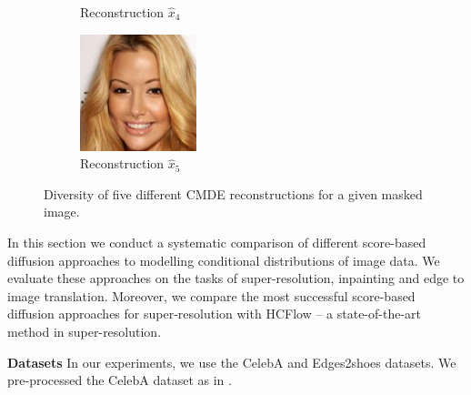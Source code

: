 \begin{figure}
\begin{subfigure}{.135\textwidth}
        \caption{\scriptsize Reconstruction $\hat{x}_4$}
    \end{subfigure}
    \begin{subfigure}{.135\textwidth}
        \includegraphics[width=\textwidth]{Chapter2/samples/diversity/5.png}
        \caption{\scriptsize Reconstruction $\hat{x}_5$}
    \end{subfigure} 
    \caption{Diversity of five different CMDE reconstructions for a given masked image.}
\end{figure}

In this section we conduct a systematic comparison of different score-based diffusion approaches to modelling conditional distributions of image data. We evaluate these approaches on the tasks of super-resolution, inpainting and edge to image translation.  Moreover, we compare the most successful score-based diffusion approaches for super-resolution with HCFlow  \cite{liang2021hrflow} -- a state-of-the-art method in super-resolution.

\noindent
\textbf{Datasets} In our experiments, we use the CelebA \cite{2015celeba} and Edges2shoes \cite{yu2014sketch2shoe,isola2018pix2pix} datasets. We pre-processed the CelebA dataset as in \cite{liang2021hrflow}.

